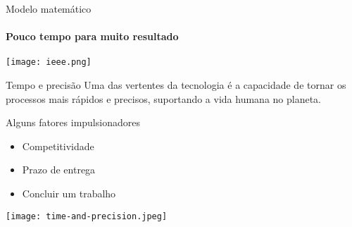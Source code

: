 \begin{frame}[c]{Modelo matemático} 
    \framesubtitle{Pouco tempo para muito resultado}
    \transdissolve[duration=0.5]
   
    \centering
    \texttt{[image: ieee.png]}
\end{frame}
\begin{frame}[t]{Tempo e precisão}
    \transboxout[duration=0.5]
    Uma das vertentes da tecnologia é a capacidade de tornar os processos mais rápidos e precisos, suportando a vida humana no planeta.

    \vspace*{0.2cm}
    Alguns fatores impulsionadores
		\begin{itemize}
			\item Competitividade
			\item Prazo de entrega
			\item Concluir um trabalho 
		\end{itemize}

    \vspace*{0.2cm}
    \texttt{[image: time-and-precision.jpeg]}

    \begin{columns}
    \end{columns}
\end{frame}
